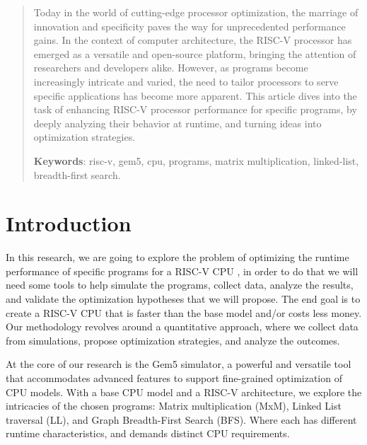 \documentclass[
	article,			%
	11pt,				%
	oneside,			%
	a4paper,			%
	brazil,				%
        english,			%
	sumario=tradicional
	]{abntex2}
\begin{document}
\frenchspacing
\maketitle

\begin{abstract}
Today in the world of cutting-edge processor optimization, the marriage of innovation and specificity paves the way for unprecedented performance gains. In the context of computer architecture, the RISC-V processor has emerged as a versatile and open-source platform, bringing the attention of researchers and developers alike. However, as programs become increasingly intricate and varied, the need to tailor processors to serve specific applications has become more apparent. This article dives into the task of enhancing RISC-V processor performance for specific programs, by deeply analyzing their behavior at runtime, and turning ideas into optimization strategies.

\vspace{\onelineskip}
 
 \noindent
 \textbf{Keywords}: risc-v, gem5, cpu, programs, matrix multiplication, linked-list, breadth-first search.
\end{abstract}

\textual
\section*{Introduction}
In this research, we are going to explore the problem of optimizing the runtime performance of specific programs for a RISC-V CPU \cite{riscv-pt-wikipedia}, in order to do that we will need some tools to help simulate the programs, collect data, analyze the results, and validate the optimization hypotheses that we will propose. The end goal is to create a RISC-V CPU that is faster than the base model and/or costs less money. Our methodology revolves around a quantitative approach, where we collect data from simulations, propose optimization strategies, and analyze the outcomes.

At the core of our research is the Gem5 simulator, a powerful and versatile tool that accommodates advanced features to support fine-grained optimization of CPU models. With a base CPU model and a RISC-V architecture, we explore the intricacies of the chosen programs: Matrix multiplication (MxM), Linked List traversal (LL), and Graph Breadth-First Search (BFS). Where each has different runtime characteristics, and demands distinct CPU requirements.
\end{document}
